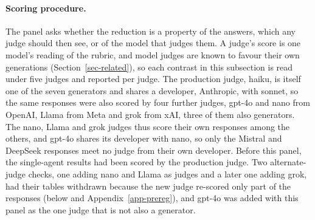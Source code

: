 \paragraph{Scoring procedure.}
The panel asks whether the reduction is a property of the answers, which any
judge should then see, or of the model that judges them. A judge's score is one model's reading of the rubric, and
model judges are known to favour their own generations
(Section~\ref{sec-related}), so each contrast in this subsection is read
under five judges and reported per judge. The production judge, haiku, is
itself one of the seven generators and shares a developer, Anthropic, with
sonnet, so the same responses were also scored by four further judges,
gpt-4o and nano from OpenAI, Llama from Meta and grok from xAI, three of them
also generators. The nano,
Llama and grok judges thus score their own responses among the others, and
gpt-4o shares its developer with nano, so only the Mistral and DeepSeek
responses meet no judge from their own developer. Before this panel, the
single-agent results had been scored by the production judge. Two
alternate-judge checks, one adding nano and Llama as judges and a later one
adding grok, had their tables withdrawn because the new judge re-scored only
part of the responses (below and Appendix~\ref{app-prereg}), and gpt-4o was
added with this panel as the one judge that is not also a generator.

